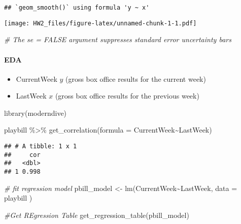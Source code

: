 \documentclass[
]{article}
\newenvironment{Shaded}{\begin{snugshade}}{\end{snugshade}}
\newcommand{\AttributeTok}[1]{\textcolor[rgb]{0.77,0.63,0.00}{#1}}
\newcommand{\CommentTok}[1]{\textcolor[rgb]{0.56,0.35,0.01}{\textit{#1}}}
\newcommand{\FunctionTok}[1]{\textcolor[rgb]{0.00,0.00,0.00}{#1}}
\newcommand{\NormalTok}[1]{#1}
\newcommand{\OtherTok}[1]{\textcolor[rgb]{0.56,0.35,0.01}{#1}}
\newcommand{\SpecialCharTok}[1]{\textcolor[rgb]{0.00,0.00,0.00}{#1}}
\begin{document}
\begin{verbatim}
## `geom_smooth()` using formula 'y ~ x'
\end{verbatim}

\texttt{[image: HW2\_files/figure-latex/unnamed-chunk-1-1.pdf]}

\begin{Shaded}
\begin{Highlighting}[]
\CommentTok{\# The se = FALSE argument suppresses standard error uncertainty bars}
\end{Highlighting}
\end{Shaded}

\hypertarget{eda}{%
\paragraph{EDA}\label{eda}}

\begin{itemize}
\item
  CurrentWeek \(y\) (gross box office results for the current week)
\item
  LastWeek \(x\) (gross box office results for the previous week)
\end{itemize}

\begin{Shaded}
\begin{Highlighting}[]
\FunctionTok{library}\NormalTok{(moderndive)}

\NormalTok{playbill }\SpecialCharTok{\%\textgreater{}\%} 
  \FunctionTok{get\_correlation}\NormalTok{(}\AttributeTok{formula =}\NormalTok{ CurrentWeek}\SpecialCharTok{\textasciitilde{}}\NormalTok{LastWeek)}
\end{Highlighting}
\end{Shaded}

\begin{verbatim}
## # A tibble: 1 x 1
##     cor
##   <dbl>
## 1 0.998
\end{verbatim}

\begin{Shaded}
\begin{Highlighting}[]
\CommentTok{\# fit regression model }
\NormalTok{pbill\_model }\OtherTok{\textless{}{-}} \FunctionTok{lm}\NormalTok{(CurrentWeek}\SpecialCharTok{\textasciitilde{}}\NormalTok{LastWeek, }\AttributeTok{data =}\NormalTok{ playbill )}

\CommentTok{\#Get REgression Table}
\FunctionTok{get\_regression\_table}\NormalTok{(pbill\_model)}
\end{Highlighting}
\end{Shaded}
\end{document}
